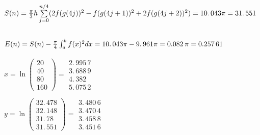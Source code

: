 \documentclass{article}
\begin{document}
\subsection{$S(n)=\frac{\protect\pi }{3}h\sum%
\limits_{j=0}^{n/4}(2f(g(4j))^{2}-f(g(4j+1))^{2}+2f(g(4j+2))^{2})=%
\allowbreak 10.\,\allowbreak 043\protect\pi =\allowbreak 31.\,\allowbreak
551 $}

\subsection{$E(n)=S(n)-\frac{\protect\pi }{4}\protect\int_{a}^{b}f(x)^{2}dx=%
\allowbreak \allowbreak \allowbreak 10.\,\allowbreak 043\protect\pi %
-\allowbreak 9.\,\allowbreak 961\protect\pi =\allowbreak 0.082\,\protect\pi %
=\allowbreak 0.257\,61$}

\bigskip $x=\ln (%
\begin{array}{c}
20 \\ 
40 \\ 
80 \\ 
160%
\end{array}%
)=\allowbreak 
\begin{array}{c}
2.\,\allowbreak 995\,7 \\ 
3.\,\allowbreak 688\,9 \\ 
4.\,\allowbreak 382 \\ 
5.\,\allowbreak 075\,2%
\end{array}%
\allowbreak $

$y=\ln (%
\begin{array}{c}
32.\,\allowbreak 478 \\ 
\allowbreak 32.\,\allowbreak 148 \\ 
31.\,\allowbreak 78 \\ 
\allowbreak 31.\,\allowbreak 551%
\end{array}%
)=\allowbreak 
\begin{array}{c}
3.\,\allowbreak 480\,6 \\ 
3.\,\allowbreak 470\,4 \\ 
3.\,\allowbreak 458\,8 \\ 
3.\,\allowbreak 451\,6%
\end{array}%
\allowbreak $
\end{document}
